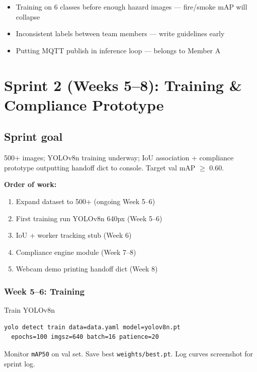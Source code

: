 \documentclass[12pt,a4paper]{report}
\begin{document}
\begin{pitfallbox}
\begin{itemize}
    \item Training on 6 classes before enough hazard images --- fire/smoke mAP will collapse
    \item Inconsistent labels between team members --- write guidelines early
    \item Putting MQTT publish in inference loop --- belongs to Member A
\end{itemize}
\end{pitfallbox}

\chapter{Sprint 2 (Weeks 5--8): Training \& Compliance Prototype}

\section{Sprint goal}

500+ images; YOLOv8n training underway; IoU association + compliance prototype outputting handoff dict to console. Target val mAP $\geq$ 0.60.

\begin{approachbox}
\textbf{Order of work:}
\begin{enumerate}
    \item Expand dataset to 500+ (ongoing Week 5--6)
    \item First training run YOLOv8n 640px (Week 5--6)
    \item IoU + worker tracking stub (Week 6)
    \item Compliance engine module (Week 7--8)
    \item Webcam demo printing handoff dict (Week 8)
\end{enumerate}
\end{approachbox}

\subsection{Week 5--6: Training}

\begin{stepbox}{Train YOLOv8n}
\begin{verbatim}
yolo detect train data=data.yaml model=yolov8n.pt
  epochs=100 imgsz=640 batch=16 patience=20
\end{verbatim}
Monitor \texttt{mAP50} on val set. Save best \texttt{weights/best.pt}. Log curves screenshot for sprint log.
\end{stepbox}
\end{document}
